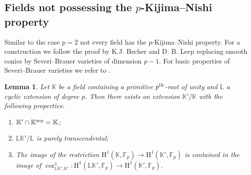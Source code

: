 \documentclass{amsart}
\newtheorem{lem}[thm]{Lemma}
\theoremstyle{definition}
\theoremstyle{remark}
\DeclareMathOperator{\cores}{cor}
\newcommand{\KK}{\mathbb{K}}
\newcommand{\LL}{\mathbb{L}}
\newcommand{\FF}{\mathbb{F}}
\newcommand{\rmH}{\mathrm H}%
\newcommand{\pth}{{p^{\rm th}}}
\begin{document}
\subsection{Fields not possessing the \texorpdfstring{$p$}{}-Kijima--Nishi property}
\label{ssec:fields without KN}
Similar to the case $p=2$ not every field has the $p$-Kijima--Nishi property. For a construction we follow the proof by K.J. Becher and D. B. Leep \cite[Lem. 4.7 and Lem. 4.8]{BecherLeep2014} replacing smooth conics by Severi--Brauer varieties of dimension $p-1$. For basic properties of Severi--Brauer varieties we refer to \cite[\S 5]{GilleSzamuely}.
\begin{lem}
\label{lem:big function field construction}
    Let $\KK$ be a field containing a primitive $\pth$-root of unity and $\LL$ a cyclic extension of degree $p$. Then there exists an extension $\KK'/\KK$ with the following properties:
    \begin{enumerate}
        \item \label{it:K_L/K is regular} $\KK'\cap \KK^{\rm sep}=\KK$;
        \item \label{it:LK_L/L is transcendental} $\LL\KK'/\LL$ is purely transcendental;
        \item \label{it:restriction corestriction condition} The image of the restriction $\rmH^1(\KK,\FF_p)\to \rmH^1(\KK',\FF_p)$ is contained in the image of $\cores^1_{\LL\KK',\KK'}:\rmH^1(\LL\KK',\FF_p)\to \rmH^1(\KK',\FF_p)$.
    \end{enumerate}
\end{lem}
\end{document}
